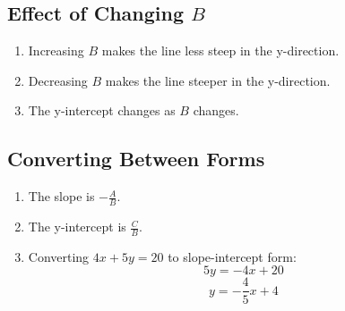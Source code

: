 \documentclass[12pt]{article}
\begin{document}

\subsection*{Effect of Changing \(B\)}
\begin{enumerate}
    \item Increasing \(B\) makes the line less steep in the y-direction.
    \item Decreasing \(B\) makes the line steeper in the y-direction.
    \item The y-intercept changes as \(B\) changes.
\end{enumerate}

\subsection*{Converting Between Forms}
\begin{enumerate}
    \item The slope is \(-\frac{A}{B}\).
    \item The y-intercept is \(\frac{C}{B}\).
    \item Converting \(4x + 5y = 20\) to slope-intercept form:
   \[
   5y = -4x + 20
   \]
   \[
   y = -\frac{4}{5}x + 4
   \]
\end{enumerate}
\end{document}
